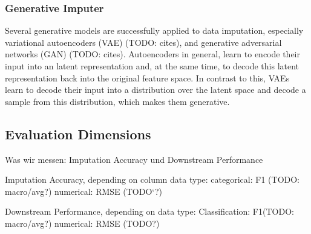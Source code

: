 \subsubsection{Generative Imputer}
%
Several generative models are successfully applied to data imputation, especially variational autoencoders (VAE) (TODO: cites), and generative adversarial networks (GAN) (TODO: cites). Autoencoders in general, learn to encode their input into an latent representation and, at the same time, to decode this latent representation back into the original feature space. In contrast to this, VAEs learn to decode their input into a distribution over the latent space and decode a sample from this distribution, which makes them generative.



\subsection{Evaluation Dimensions}
%

Was wir messen:
Imputation Accuracy und Downstream Performance

Imputation Accuracy, depending on column data type:
categorical: F1 (TODO: macro/avg?)
numerical: RMSE (TODO`?)

Downstream Performance, depending on data type:
Classification: F1(TODO: macro/avg?)
numerical: RMSE (TODO?)
